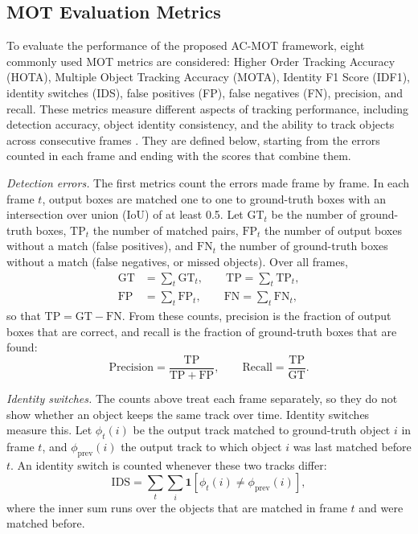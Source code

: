 \documentclass[journal]{new-aiaa}
\begin{document}
\subsection{MOT Evaluation Metrics}\label{sec:metrics}
To evaluate the performance of the proposed AC-MOT framework, eight commonly
used MOT metrics are considered: Higher Order Tracking
Accuracy (HOTA), Multiple Object Tracking Accuracy (MOTA), Identity F1 Score
(IDF1), identity switches (IDS), false positives (FP), false negatives (FN),
precision, and recall. These metrics measure different aspects of tracking
performance, including detection accuracy, object identity consistency, and
the ability to track objects across consecutive frames
\cite{dendorfer2021motchallenge,luiten2021hota}. They are defined below,
starting from the errors counted in each frame and ending with the scores that
combine them.

\emph{Detection errors.} The first metrics count the errors made frame by
frame. In each frame $t$, output boxes are matched one to one to ground-truth boxes with an intersection over union (IoU) of at least 0.5. Let $\mathrm{GT}_t$ be
the number of ground-truth boxes, $\mathrm{TP}_t$ the number of matched pairs,
$\mathrm{FP}_t$ the number of output boxes without a match (false positives),
and $\mathrm{FN}_t$ the number of ground-truth boxes without a match (false
negatives, or missed objects). Over all frames,
\begin{align}
\mathrm{GT}&=\sum_t \mathrm{GT}_t,\qquad \mathrm{TP}=\sum_t \mathrm{TP}_t,\label{eq:gt}\\
\mathrm{FP}&=\sum_t \mathrm{FP}_t,\qquad \mathrm{FN}=\sum_t \mathrm{FN}_t,\label{eq:fpfn}
\end{align}
so that $\mathrm{TP}=\mathrm{GT}-\mathrm{FN}$. From these counts, precision
is the fraction of output boxes that are correct, and recall is the fraction of ground-truth
boxes that are found:
\begin{equation}
\mathrm{Precision}=\frac{\mathrm{TP}}{\mathrm{TP}+\mathrm{FP}},\qquad
\mathrm{Recall}=\frac{\mathrm{TP}}{\mathrm{GT}}.
\label{eq:prrc}
\end{equation}

\emph{Identity switches.} The counts above treat each frame separately, so
they do not show whether an object keeps the same track over time. Identity
switches measure this. Let $\phi_t(i)$ be the output track matched to
ground-truth object $i$ in frame $t$, and $\phi_{\mathrm{prev}}(i)$ the
output track to which object $i$ was last matched before $t$. An identity
switch is counted whenever these two tracks differ:
\begin{equation}
\mathrm{IDS}=\sum_t\sum_{i}\mathbf{1}\!\left[\phi_t(i)\neq\phi_{\mathrm{prev}}(i)\right],
\label{eq:ids}
\end{equation}
where the inner sum runs over the objects that are matched in frame $t$ and
were matched before.
\end{document}
